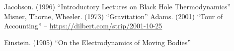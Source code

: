 \documentclass[12pt]{article}
\begin{document}
\begin{thebibliography}{9}
 Jacobson. (1996) ``Introductory Lectures on Black Hole Thermodynamics''
 Misner, Thorne, Wheeler. (1973) ``Gravitation''
 Adams. (2001) ``Tour of Accounting'' -- \url{https://dilbert.com/strip/2001-10-25}

 Einstein. (1905) ``On the Electrodynamics of Moving Bodies''

\end{thebibliography}
\end{document}
